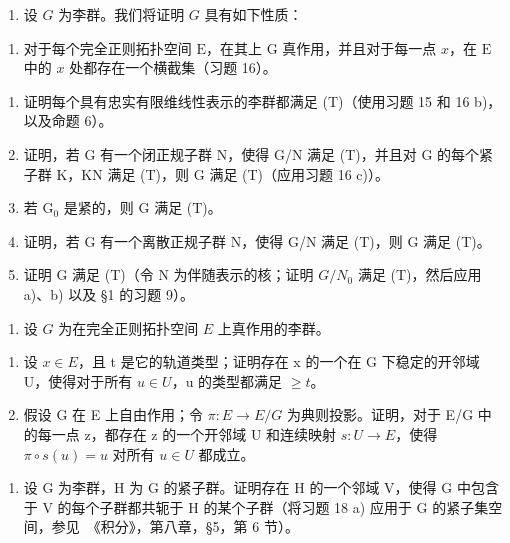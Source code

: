 \begin{enumerate}
\def\labelenumi{\arabic{enumi})}
\setcounter{enumi}{16}
\tightlist
\item
  设 \(G\) 为李群。我们将证明 \(G\) 具有如下性质：
\end{enumerate}

\begin{enumerate}
\def\labelenumi{(\Alph{enumi})}
\setcounter{enumi}{19}
\tightlist
\item
  对于每个完全正则拓扑空间 \(\mathrm{E}\)，在其上 \(\mathrm{G}\) 真作用，并且对于每一点 \(x\)，在 \(\mathrm{E}\) 中的 \(x\) 处都存在一个横截集（习题 16）。
\end{enumerate}

\begin{enumerate}
\def\labelenumi{\alph{enumi})}
\item
  证明每个具有忠实有限维线性表示的李群都满足 (T)（使用习题 15 和 16 b)，以及命题 6）。
\item
  证明，若 G 有一个闭正规子群 N，使得 G/N 满足 (T)，并且对 G 的每个紧子群 K，KN 满足 (T)，则 G 满足 (T)（应用习题 16 c)）。
\item
  若 \(\mathrm{G}_0\) 是紧的，则 G 满足 (T)。
\item
  证明，若 G 有一个离散正规子群 N，使得 G/N 满足 (T)，则 G 满足 (T)。
\item
  证明 G 满足 (T)（令 N 为伴随表示的核；证明 \(G/N_{0}\) 满足 (T)，然后应用 a)、b) 以及 §1 的习题 9）。
\end{enumerate}

\begin{enumerate}
\def\labelenumi{\arabic{enumi})}
\setcounter{enumi}{17}
\tightlist
\item
  设 \(G\) 为在完全正则拓扑空间 \(E\) 上真作用的李群。
\end{enumerate}

\begin{enumerate}
\def\labelenumi{\alph{enumi})}
\item
  设 \(x \in E\)，且 t 是它的轨道类型；证明存在 x 的一个在 G 下稳定的开邻域 U，使得对于所有 \(u \in U\)，u 的类型都满足 \(\geq t\)。
\item
  假设 G 在 E 上自由作用；令 \(\pi: E \to E/G\) 为典则投影。证明，对于 E/G 中的每一点 z，都存在 z 的一个开邻域 U 和连续映射 \(s: U \to E\)，使得 \(\pi \circ s(u) = u\) 对所有 \(u \in U\) 都成立。
\end{enumerate}

\begin{enumerate}
\def\labelenumi{\arabic{enumi})}
\setcounter{enumi}{18}
\tightlist
\item
  设 G 为李群，H 为 G 的紧子群。证明存在 H 的一个邻域 V，使得 G 中包含于 V 的每个子群都共轭于 H 的某个子群（将习题 18 a) 应用于 G 的紧子集空间，参见~《积分》，第八章，§5，第 6 节）。
\end{enumerate}


